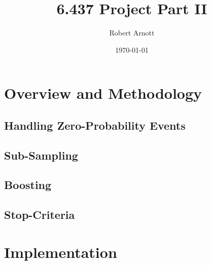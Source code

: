 \documentclass[secnumaric,notitlepage,amsmath,amssymb,nofootinbib,floatfix,12pt]{revtex4-1}
\begin{document}
\title{6.437 Project Part II}
\author{Robert Arnott}
\date{\today}

\maketitle
\section*{Overview and Methodology}

\subsection*{Handling Zero-Probability Events}

\subsection*{Sub-Sampling}

\subsection*{Boosting}

\subsection*{Stop-Criteria}

\section*{Implementation}
\end{document}
